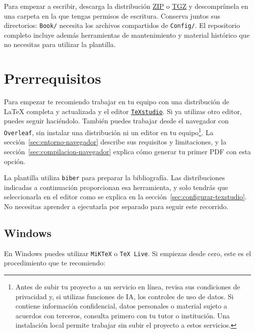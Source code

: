 Para empezar a escribir, descarga la distribución \href{https://www.dropbox.com/scl/fi/tgaa8elj9sq3qbssptuys/03-PhDTFMTFG-LaTeX-Template.zip?rlkey=t01rv4tizsfw96vy0dcp902z0&dl=1}{ZIP} o \href{https://www.dropbox.com/scl/fi/1wjkpc4rkqadw3v0va81q/03-PhDTFMTFG-LaTeX-Template.tgz?rlkey=83j0c0hucbvryz6yf9p6xik3v&dl=1}{TGZ} y descomprímela en una carpeta en la que tengas permisos de escritura. Conserva juntos sus directorios: \texttt{Book/} necesita los archivos compartidos de \texttt{Config/}. El repositorio completo incluye además herramientas de mantenimiento y material histórico que no necesitas para utilizar la plantilla.

\section{Prerrequisitos}
\label{sec:prerrequisitos}

Para empezar te recomiendo trabajar en tu equipo con una distribución de \LaTeX{} completa y actualizada y el editor \href{https://www.texstudio.org/}{\texttt{TeXstudio}}. Si ya utilizas otro editor, puedes seguir haciéndolo. También puedes trabajar desde el navegador con \texttt{Overleaf}, sin instalar una distribución ni un editor en tu equipo\footnote{Antes de subir tu proyecto a un servicio en línea, revisa sus condiciones de privacidad y, si utilizas funciones de IA, los controles de uso de datos. Si contiene información confidencial, datos personales o material sujeto a acuerdos con terceros, consulta primero con tu tutor o institución. Una instalación local permite trabajar sin subir el proyecto a estos servicios.}. La sección~\ref{sec:entorno-navegador} describe sus requisitos y limitaciones, y la sección~\ref{sec:compilacion-navegador} explica cómo generar tu primer PDF con esta opción.

La plantilla utiliza \texttt{biber} para preparar la bibliografía. Las distribuciones indicadas a continuación proporcionan esa herramienta, y solo tendrás que seleccionarla en el editor como se explica en la sección~\ref{sec:configurar-texstudio}. No necesitas aprender a ejecutarla por separado para seguir este recorrido.

\subsection{Windows}

En Windows puedes utilizar \texttt{MiKTeX} o \texttt{TeX Live}. Si empiezas desde cero, este es el procedimiento que te recomiendo:

